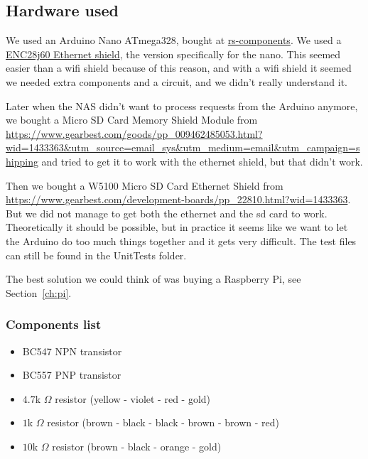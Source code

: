 \subsection{Hardware used}\label{subsec:hardwareUsed}
We used an Arduino Nano ATmega328, bought at \href{http://nl.rs-online.com/}{rs-components}.
We used a \href{http://www.mijn-gadgets.nl/Webwinkel-Product-157562595/ENC28J60-Ethernet-Shield-Network-Module-V1.0-For-Arduino-Nano.html}{ENC28j60 Ethernet shield}, the version specifically for the nano.
This seemed easier than a wifi shield because of this reason, and with a wifi shield it seemed we needed extra components and a circuit, and we didn't really understand it.

Later when the NAS didn't want to process requests from the Arduino anymore, we bought a Micro SD Card Memory Shield Module from \url{https://www.gearbest.com/goods/pp_009462485053.html?wid=1433363&utm_source=email_sys&utm_medium=email&utm_campaign=shipping} and tried to get it to work with the ethernet shield, but that didn't work.

Then we bought a W5100 Micro SD Card Ethernet Shield from \url{https://www.gearbest.com/development-boards/pp_22810.html?wid=1433363}.
But we did not manage to get both the ethernet and the sd card to work.
Theoretically it should be possible, but in practice it seems like we want to let the Arduino do too much things together and it gets very difficult.
The test files can still be found in the UnitTests folder.

The best solution we could think of was buying a Raspberry Pi, see Section~\ref{ch:pi}.

\subsubsection{Components list}
	\begin{itemize}
		\item BC547 NPN transistor
		\item BC557 PNP transistor
		\item $4.7$k $\Omega$ resistor (yellow - violet - red - gold)
		\item $1$k $\Omega$ resistor (brown - black - black - brown - brown - red)
		\item $10$k $\Omega$ resistor (brown - black - orange - gold)
	\end{itemize}
